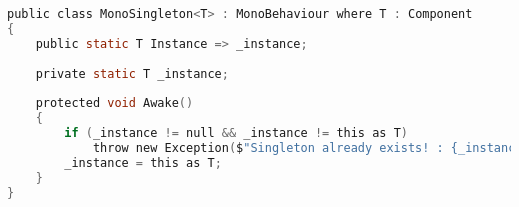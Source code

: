 \begin{lstlisting}[language={C},label=lst:monosingleton,caption={Klasa \texttt{MonoSingleton}}]
public class MonoSingleton<T> : MonoBehaviour where T : Component
{
    public static T Instance => _instance;
    
    private static T _instance;
    
    protected void Awake()
    {
        if (_instance != null && _instance != this as T)
            throw new Exception($"Singleton already exists! : {_instance.name}");
        _instance = this as T;
    }
}
\end{lstlisting}